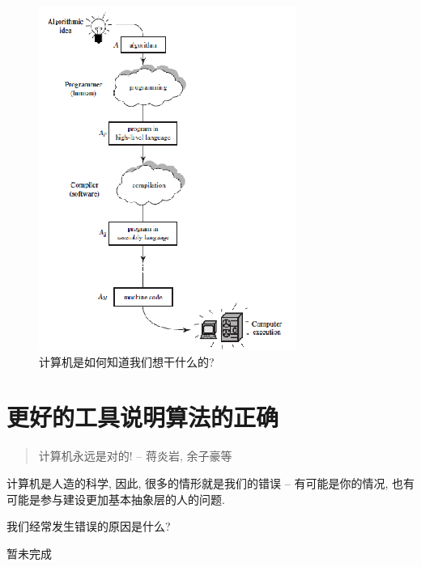 \begin{figure}[h!]
	\centering
	\includegraphics[scale=0.8]{4-programs/figs/machine-note}
	\caption{计算机是如何知道我们想干什么的?}
	\label{figs:do-we-want}
	
\end{figure}


\section{更好的工具说明算法的正确}

\begin{quote}
	计算机永远是对的! \hfill -- 蒋炎岩, 余子豪等
\end{quote}

计算机是人造的科学, 因此, 很多的情形就是我们的错误 -- 有可能是你的情况, 也有可能是参与建设更加基本抽象层的人的问题. 

\begin{bonus}
	我们经常发生错误的原因是什么? 
\end{bonus}

暂未完成
